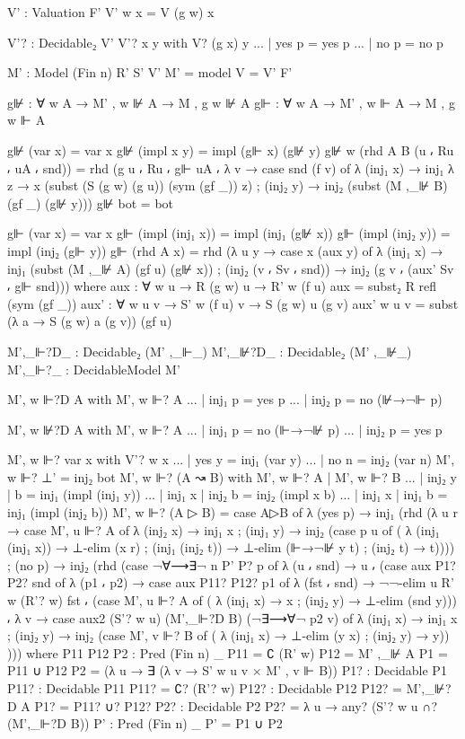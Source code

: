 \begin{spverbatim}
  V' : Valuation F'
  V' w x = V (g w) x

  V'? : Decidable₂ V'
  V'? x y with V? (g x) y
  ... | yes p = yes p
  ... | no p = no p

  M' : Model (Fin n) R' S' V'
  M' = model {V = V'} F'

  g⊮ : ∀ {w A} → M' , w ⊮ A → M , g w ⊮ A
  g⊩ : ∀ {w A} → M' , w ⊩ A → M , g w ⊩ A

  g⊮ (var x) = var x
  g⊮ (impl x y) = impl (g⊩ x) (g⊮ y)
  g⊮ {w} (rhd {A} {B} (u ⸴ Ru ⸴ uA ⸴ snd)) = rhd (g u ⸴ Ru ⸴ g⊩ uA
    ⸴ λ v → case snd (f v) of λ {
    (inj₁ x) → inj₁ λ z → x (subst (S (g w) (g u)) (sym (gf _)) z) ;
    (inj₂ y) → inj₂ (subst (M ,_⊮ B) (gf _) (g⊮ y))})
  g⊮ bot = bot

  g⊩ (var x) = var x
  g⊩ (impl (inj₁ x)) = impl (inj₁ (g⊮ x))
  g⊩ (impl (inj₂ y)) = impl (inj₂ (g⊩ y))
  g⊩ (rhd {A} x) = rhd (λ {u} y → case x (aux y) of
    λ { (inj₁ x) → inj₁ (subst (M ,_⊮ A) (gf u) (g⊮ x))
    ; (inj₂ (v ⸴ Sv ⸴ snd)) → inj₂ (g v ⸴ (aux' Sv ⸴ g⊩ snd))})
    where
    aux : ∀ {w u} → R (g w) u → R' w (f u)
    aux = subst₂ R refl (sym (gf _))
    aux' : ∀ {w u v} → S' w (f u) v → S (g w) u (g v)
    aux' {w} {u} {v} = subst (λ a → S (g w) a (g v)) (gf u)

  M',_⊩?D_ : Decidable₂ (M' ,_⊩_)
  M',_⊮?D_ : Decidable₂ (M' ,_⊮_)
  M',_⊩?_ : DecidableModel M'

  M', w ⊩?D A with M', w ⊩? A
  ... | inj₁ p = yes p
  ... | inj₂ p = no (⊮→¬⊩ p)

  M', w ⊮?D A with M', w ⊩? A
  ... | inj₁ p = no (⊩→¬⊮ p)
  ... | inj₂ p = yes p


  M', w ⊩? var x with V'? w x
  ... | yes y = inj₁ (var y)
  ... | no n = inj₂ (var n)
  M', w ⊩? ⊥' = inj₂ bot
  M', w ⊩? (A ↝ B) with M', w ⊩? A | M', w ⊩? B
  ... | inj₂ y | b = inj₁ (impl (inj₁ y))
  ... | inj₁ x | inj₂ b = inj₂ (impl x b)
  ... | inj₁ x | inj₁ b = inj₁ (impl (inj₂ b))
  M', w ⊩? (A ▷ B) = case A▷B of
    λ { (yes p) → inj₁ (rhd (λ {u} r → case M', u ⊩? A of
        λ { (inj₂ x) → inj₁ x
        ; (inj₁ y) → inj₂ (case p u of (
          λ { (inj₁ (inj₁ x)) → ⊥-elim (x r)
          ; (inj₁ (inj₂ t)) → ⊥-elim (⊩→¬⊮ y t)
          ; (inj₂ t) → t}))})) ;
      (no p) → inj₂ (rhd (case ¬∀⟶∃¬ n P' P? p of
        λ { (u ⸴ snd) → u ⸴ (case aux P1? P2? snd of
          λ { (p1 ⸴ p2) → case aux P11? P12? p1 of
            λ { (fst ⸴ snd) → ¬¬-elim {u} {R' w} (R'? w) fst
            ⸴ (case M', u ⊩? A of (
              λ { (inj₁ x) → x ; (inj₂ y) → ⊥-elim (snd y)}))
              ⸴ λ v → case aux2 (S'? w u) (M',_⊩?D B) (¬∃⟶∀¬ p2 v) of
                λ { (inj₁ x) → inj₁ x ; (inj₂ y) → inj₂ (case M', v ⊩? B of (
                λ { (inj₁ x) → ⊥-elim (y x)
                  ; (inj₂ y) → y})) }}})})) }
    where
    P11 P12 P2 : Pred (Fin n) _
    P11 = ∁ (R' w)
    P12 = M' ,_⊮ A
    P1 = P11 ∪ P12
    P2 = (λ u → ∃ (λ v → S' w u v × M' , v ⊩ B))
    P1? : Decidable P1
    P11? : Decidable P11
    P11? = ∁? (R'? w)
    P12? : Decidable P12
    P12? = M',_⊮?D A
    P1? = P11? ∪? P12?
    P2? : Decidable P2
    P2? = λ u → any? (S'? w u ∩? (M',_⊩?D B))
    P' : Pred (Fin n) _
    P' = P1 ∪ P2


\end{spverbatim}

